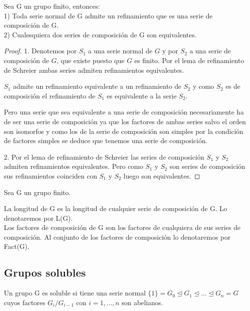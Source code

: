 \begin{theorem}
Sea G un grupo finito, entonces:\\
1) Toda serie normal de G admite un refinamiento que es una serie de composición de G.\\
2) Cualesquiera dos series de composición de G son equivalentes.
\end{theorem}
\begin{proof}
1. Denotemos por $S_1$ a una serie normal de $G$ y por $S_2$ a una serie de composición de $G$, que existe puesto que $G$ es finito. Por el lema de refinamiento de Schreier ambas series admiten refinamientos equivalentes. 

$S_1$ admite un refinamiento equivalente a un refinamiento de $S_2$ y como $S_2$ es de composición el refinamiento de $S_1$ es equivalente a la serie $S_2$.

Pero una serie que sea equivalente a una serie de composición necesariamente ha de ser una serie de composición ya que los factores de ambas series salvo el orden son isomorfos y como los de la serie de composición son simples por la condición de factores simples se deduce que tenemos una serie de composición.

2. Por el lema de refinamiento de Schreier las series de composición $S_1$ y $S_2$ admiten refinamientos equivalentes. Pero como $S_1$ y $S_2$ son series de composición sus refinamientos coinciden con $S_1$ y $S_2$ luego son equivalentes.
\end{proof}

\begin{definition}
Sea G un grupo finito.

La longitud de G es la longitud de cualquier serie de composición de G. Lo denotaremos por L(G).\\
Los factores de composición de G son los factores de cualquiera de sus series de composición. Al conjunto de los factores de composición lo denotaremos por Fact(G).
\end{definition}

\subsection{Grupos solubles}

\begin{definition}
Un grupo G es soluble si tiene una serie normal $\{1\} = G_0 \trianglelefteq G_1 \trianglelefteq ... \trianglelefteq G_n = G$ cuyos factores $G_i/G_{i-1}$ con $i=1,...,n$ son abelianos.
\end{definition}

